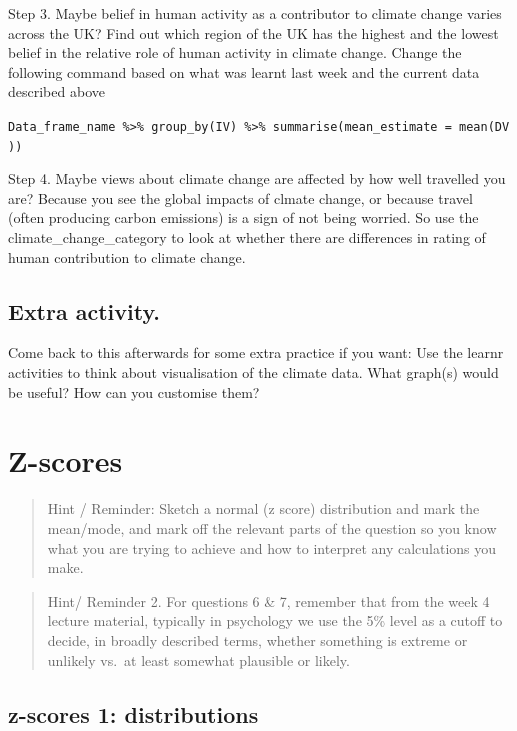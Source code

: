\documentclass[
]{book}
\begin{document}
Step 3. Maybe belief in human activity as a contributor to climate change varies across the UK? Find out which region of the UK has the highest and the lowest belief in the relative role of human activity in climate change. Change the following command based on what was learnt last week and the current data described above

\texttt{Data\_frame\_name\ \%\textgreater{}\%\ group\_by(IV)\ \%\textgreater{}\%\ summarise(mean\_estimate\ =\ mean(DV))}

Step 4. Maybe views about climate change are affected by how well travelled you are? Because you see the global impacts of clmate change, or because travel (often producing carbon emissions) is a sign of not being worried. So use the climate\_change\_category to look at whether there are differences in rating of human contribution to climate change.

\hypertarget{extra-activity.}{%
\subsection{Extra activity.}\label{extra-activity.}}

Come back to this afterwards for some extra practice if you want: Use the learnr activities to think about visualisation of the climate data. What graph(s) would be useful? How can you customise them?

\hypertarget{z-scores}{%
\section{Z-scores}\label{z-scores}}

\begin{quote}
Hint / Reminder: Sketch a normal (z score) distribution and mark the mean/mode, and mark off the relevant parts of the question so you know what you are trying to achieve and how to interpret any calculations you make.
\end{quote}

\begin{quote}
Hint/ Reminder 2. For questions 6 \& 7, remember that from the week 4 lecture material, typically in psychology we use the 5\% level as a cutoff to decide, in broadly described terms, whether something is extreme or unlikely vs.~at least somewhat plausible or likely.
\end{quote}

\hypertarget{z-scores-1-distributions}{%
\subsection{z-scores 1: distributions}\label{z-scores-1-distributions}}
\end{document}
